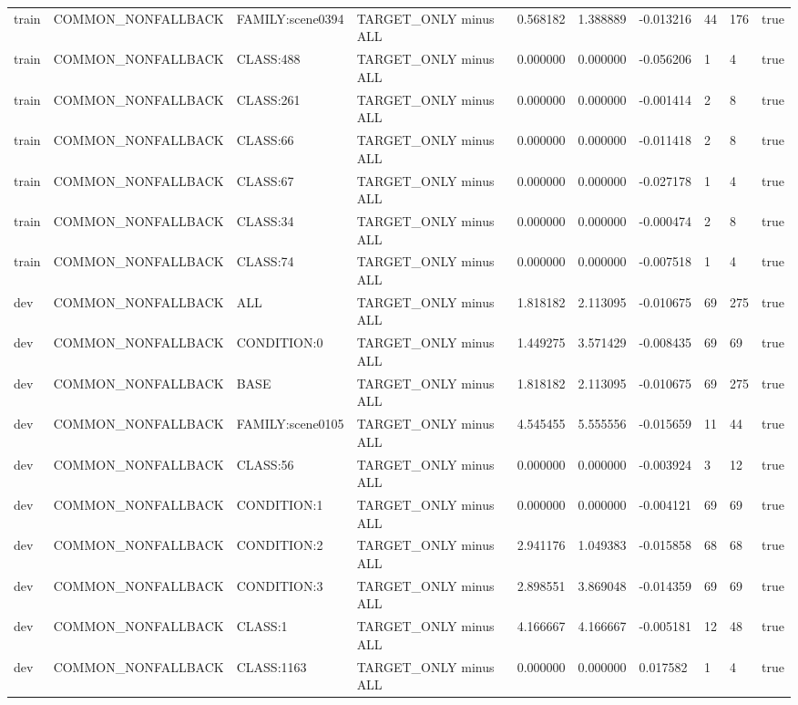 \begin{tabular}{llllllllll}
train & COMMON\_NONFALLBACK & FAMILY:scene0394 & TARGET\_ONLY minus ALL & 0.568182 & 1.388889 & -0.013216 & 44 & 176 & true \\
train & COMMON\_NONFALLBACK & CLASS:488 & TARGET\_ONLY minus ALL & 0.000000 & 0.000000 & -0.056206 & 1 & 4 & true \\
train & COMMON\_NONFALLBACK & CLASS:261 & TARGET\_ONLY minus ALL & 0.000000 & 0.000000 & -0.001414 & 2 & 8 & true \\
train & COMMON\_NONFALLBACK & CLASS:66 & TARGET\_ONLY minus ALL & 0.000000 & 0.000000 & -0.011418 & 2 & 8 & true \\
train & COMMON\_NONFALLBACK & CLASS:67 & TARGET\_ONLY minus ALL & 0.000000 & 0.000000 & -0.027178 & 1 & 4 & true \\
train & COMMON\_NONFALLBACK & CLASS:34 & TARGET\_ONLY minus ALL & 0.000000 & 0.000000 & -0.000474 & 2 & 8 & true \\
train & COMMON\_NONFALLBACK & CLASS:74 & TARGET\_ONLY minus ALL & 0.000000 & 0.000000 & -0.007518 & 1 & 4 & true \\
dev & COMMON\_NONFALLBACK & ALL & TARGET\_ONLY minus ALL & 1.818182 & 2.113095 & -0.010675 & 69 & 275 & true \\
dev & COMMON\_NONFALLBACK & CONDITION:0 & TARGET\_ONLY minus ALL & 1.449275 & 3.571429 & -0.008435 & 69 & 69 & true \\
dev & COMMON\_NONFALLBACK & BASE & TARGET\_ONLY minus ALL & 1.818182 & 2.113095 & -0.010675 & 69 & 275 & true \\
dev & COMMON\_NONFALLBACK & FAMILY:scene0105 & TARGET\_ONLY minus ALL & 4.545455 & 5.555556 & -0.015659 & 11 & 44 & true \\
dev & COMMON\_NONFALLBACK & CLASS:56 & TARGET\_ONLY minus ALL & 0.000000 & 0.000000 & -0.003924 & 3 & 12 & true \\
dev & COMMON\_NONFALLBACK & CONDITION:1 & TARGET\_ONLY minus ALL & 0.000000 & 0.000000 & -0.004121 & 69 & 69 & true \\
dev & COMMON\_NONFALLBACK & CONDITION:2 & TARGET\_ONLY minus ALL & 2.941176 & 1.049383 & -0.015858 & 68 & 68 & true \\
dev & COMMON\_NONFALLBACK & CONDITION:3 & TARGET\_ONLY minus ALL & 2.898551 & 3.869048 & -0.014359 & 69 & 69 & true \\
dev & COMMON\_NONFALLBACK & CLASS:1 & TARGET\_ONLY minus ALL & 4.166667 & 4.166667 & -0.005181 & 12 & 48 & true \\
dev & COMMON\_NONFALLBACK & CLASS:1163 & TARGET\_ONLY minus ALL & 0.000000 & 0.000000 & 0.017582 & 1 & 4 & true \\

\end{tabular}
